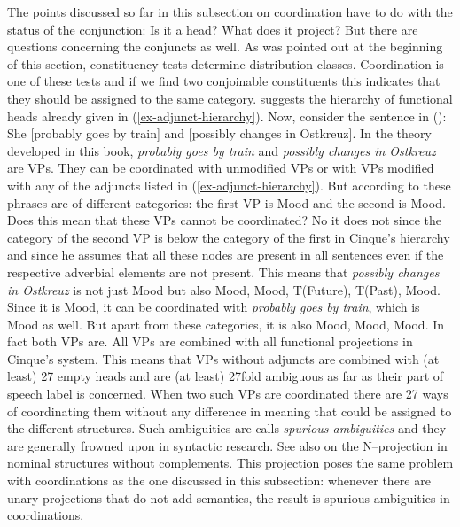 The points discussed so far in this subsection on coordination have to do with the status of the
conjunction: Is it a head? What does it project? But there are questions concerning the conjuncts as
well. As was pointed out at the beginning of this section, constituency tests determine distribution
classes. Coordination is one of these tests and if we find two conjoinable constituents this
indicates that they should be assigned to the same category.
\citet[]{Cinque99a-u} suggests the hierarchy of functional heads already given in (\ref{ex-adjunct-hierarchy}).
Now, consider the sentence in ():
\ea
She [probably goes by train] and [possibly changes in Ostkreuz].
\z
In the theory developed in this book, \emph{probably goes by train} and \emph{possibly changes in
  Ostkreuz} are VPs. They can be coordinated with unmodified VPs or with VPs modified with any of
the adjuncts listed in (\ref{ex-adjunct-hierarchy}). But according to \citeauthor{Cinque99a-u} these phrases
are of different categories: the first VP is Mood and the second is
Mood. Does this mean that these VPs cannot be coordinated? No it does not since the
category of the second VP is below the category of the first in Cinque's hierarchy and since he
assumes that all these nodes are present in all sentences even if the respective adverbial elements
are not present. This means that \emph{possibly changes in Ostkreuz} is not just
Mood but also Mood, Mood, T(Future), T(Past),
Mood. Since it is Mood, it can be coordinated with \emph{probably goes
  by train}, which is Mood as well. But apart from these categories, it is also
Mood, Mood, Mood. In fact both VPs are. All VPs are
combined with all functional projections in Cinque's system. This means that VPs without adjuncts
are combined with (at least) 27 empty heads and are (at least) 27fold ambiguous as far as their part
of speech label is concerned. When two such VPs are
coordinated there are 27 ways of coordinating them without any difference in meaning that could be
assigned to the different structures. Such ambiguities are calls \emph{spurious ambiguities} and
they are generally frowned upon in syntactic research. See also  on the
N–\nbar projection in nominal structures without complements. This projection poses the same problem
with coordinations as the one discussed in this subsection: whenever there are unary projections
that do not add semantics, the result is spurious ambiguities in coordinations.%


